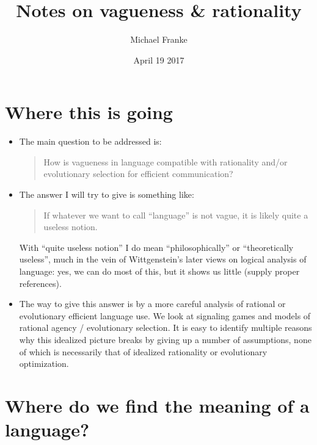 \documentclass[fleqn,reqno,10pt]{article}
\title{Notes on vagueness \& rationality}
\author{Michael Franke}
\date{April 19 2017}
\begin{document}
\maketitle

\section*{Where this is going}

\begin{itemize}
\item The main question to be addressed is:
  \begin{quote}
    How is vagueness in language compatible with rationality and/or evolutionary selection for
    efficient communication?
  \end{quote}
\item The answer I will try to give is something like:
  \begin{quote}
    If whatever we want to call ``language'' is not vague, it is likely quite a useless notion.
  \end{quote}
  With ``quite useless notion'' I do mean ``philosophically'' or ``theoretically useless'', much in
  the vein of Wittgenstein's later views on logical analysis of language: yes, we can do most
  of this, but it shows us little (supply proper references).
\item The way to give this answer is by a more careful analysis of rational or evolutionary
  efficient language use. We look at signaling games and models of rational agency /
  evolutionary selection. It is easy to identify multiple reasons why this idealized picture
  breaks by giving up a number of assumptions, none of which is necessarily that of idealized
  rationality or evolutionary optimization.
\end{itemize}

\section*{Where do we find the meaning of a language?}
\end{document}
